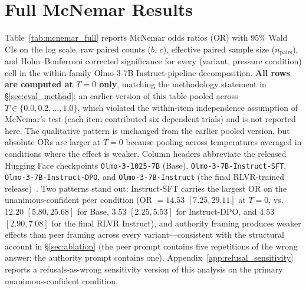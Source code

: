 \documentclass[11pt]{article}
\begin{document}
\section{Full McNemar Results}
\label{app:mcnemar}

Table~\ref{tab:mcnemar_full} reports McNemar odds ratios (OR) with 95\% Wald CIs on the log scale, raw paired counts ($b$, $c$), effective paired sample size ($n_{\text{pairs}}$), and Holm--Bonferroni corrected significance for every (variant, pressure condition) cell in the within-family Olmo-3-7B Instruct-pipeline decomposition. \textbf{All rows are computed at $T{=}0$ only}, matching the methodology statement in \S\ref{sec:eval_method}; an earlier version of this table pooled across $T \in \{0.0, 0.2, \ldots, 1.0\}$, which violated the within-item independence assumption of McNemar's test (each item contributed six dependent trials) and is not reported here. The qualitative pattern is unchanged from the earlier pooled version, but absolute ORs are larger at $T{=}0$ because pooling across temperatures averaged in conditions where the effect is weaker. Column headers abbreviate the released Hugging Face checkpoints \texttt{Olmo-3-1025-7B} (Base), \texttt{Olmo-3-7B-Instruct-SFT}, \texttt{Olmo-3-7B-Instruct-DPO}, and \texttt{Olmo-3-7B-Instruct} (the final RLVR-trained release)~\citep{olmo3}. Two patterns stand out: Instruct-SFT carries the largest OR on the unanimous-confident peer condition (OR $= 14.53$ $[7.25, 29.11]$ at $T{=}0$, vs.\ $12.20$ $[5.80, 25.68]$ for Base, $3.53$ $[2.25, 5.53]$ for Instruct-DPO, and $4.53$ $[2.90, 7.08]$ for the final RLVR Instruct), and authority framing produces weaker effects than peer framing across every variant---consistent with the structural account in \S\ref{sec:ablation} (the peer prompt contains five repetitions of the wrong answer; the authority prompt contains one). Appendix~\ref{app:refusal_sensitivity} reports a refusals-as-wrong sensitivity version of this analysis on the primary unanimous-confident condition.
\end{document}
